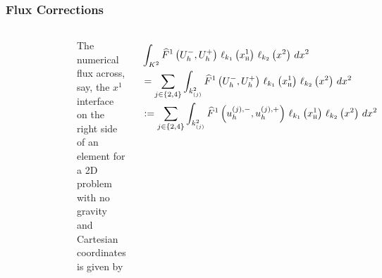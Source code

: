 \documentclass{beamer}
\begin{document}
\begin{frame}
\frametitle{Flux Corrections}

  \begin{columns}[c]


      \begin{figure}[htb!]
        \centering
        \includegraphics[width=0.9\textwidth]{fig.amrElement_facePoints.png}
      \end{figure}


      The numerical flux across, say,
      the $x^{1}$ interface on the right side of an
      element for a 2D problem with no gravity and Cartesian coordinates
      is given by

      \Fontvi

      \begin{align*}
        &\int_{K^{2}} \widehat{F}^{1}\left(U_{h}^{-},U_{h}^{+}\right) \,
        \ell_{k_{1}}\left(x^{1}_{\textsc{h}}\right) \,
        \ell_{k_{2}}\left(x^{2}\right) \, dx^{2} \\
        &= \sum\limits_{j\in\left\{2,4\right\}}
        \int_{k_{\left(j\right)}^{2}}
        \widehat{F}^{1}\left(U_{h}^{-},U_{h}^{+}\right) \,
        \ell_{k_{1}}\left(x^{1}_{\textsc{h}}\right) \,
        \ell_{k_{2}}\left(x^{2}\right) \, dx^{2} \\
        &:= \sum\limits_{j\in\left\{2,4\right\}}
        \int_{k_{\left(j\right)}^{2}}
        \widehat{F}^{1}\left(u^{\left(j\right),-}_{h},
        u^{\left(j\right),+}_{h}\right) \,
        \ell_{k_{1}}\left(x^{1}_{\textsc{h}}\right) \,
        \ell_{k_{2}}\left(x^{2}\right) \, dx^{2}
      \end{align*}

  \end{columns}

\end{frame}
\end{document}
